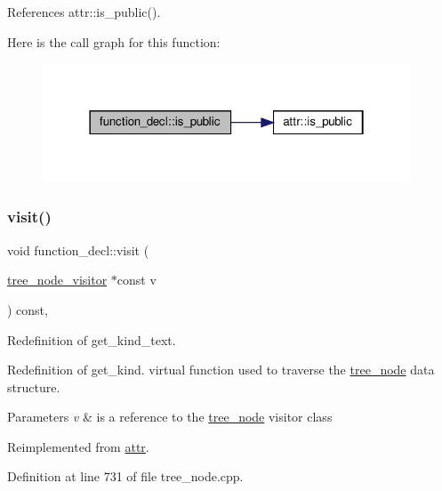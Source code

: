References attr\+::is\+\_\+public().

Here is the call graph for this function\+:
\nopagebreak
\begin{figure}[H]
\begin{center}
\leavevmode
\includegraphics[width=310pt]{d0/d43/structfunction__decl_a4358508e57432f8971ff434f1f03354b_cgraph}
\end{center}
\end{figure}
\mbox{\label{structfunction__decl_a49389fd3c1df13bb78dbc94e7350462e}} 
\subsubsection{\texorpdfstring{visit()}{visit()}}
{\footnotesize\ttfamily void function\+\_\+decl\+::visit (\begin{DoxyParamCaption}\item[{\hyperlink{classtree__node__visitor}{tree\+\_\+node\+\_\+visitor} $\ast$const}]{v }\end{DoxyParamCaption}) const\hspace{0.3cm}{\ttfamily [override]}, {\ttfamily [virtual]}}



Redefinition of get\+\_\+kind\+\_\+text. 

Redefinition of get\+\_\+kind. virtual function used to traverse the \hyperlink{classtree__node}{tree\+\_\+node} data structure. 
\begin{DoxyParams}{Parameters}
{\em v} & is a reference to the \hyperlink{classtree__node}{tree\+\_\+node} visitor class \\
\hline
\end{DoxyParams}


Reimplemented from \hyperlink{structattr_a75ba987f0d5d6b50e0aee15d25b98a5b}{attr}.



Definition at line 731 of file tree\+\_\+node.\+cpp.



